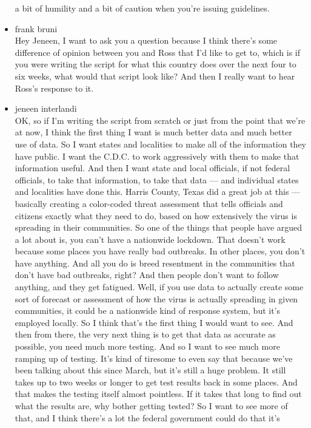 \begin{itemize}
  a bit of humility and a bit of caution when you're issuing guidelines.
\item
  frank bruni\\
  Hey Jeneen, I want to ask you a question because I think there's some
  difference of opinion between you and Ross that I'd like to get to,
  which is if you were writing the script for what this country does
  over the next four to six weeks, what would that script look like? And
  then I really want to hear Ross's response to it.
\item
  jeneen interlandi\\
  OK, so if I'm writing the script from scratch or just from the point
  that we're at now, I think the first thing I want is much better data
  and much better use of data. So I want states and localities to make
  all of the information they have public. I want the C.D.C. to work
  aggressively with them to make that information useful. And then I
  want state and local officials, if not federal officials, to take that
  information, to take that data --- and individual states and
  localities have done this. Harris County, Texas did a great job at
  this --- basically creating a color-coded threat assessment that tells
  officials and citizens exactly what they need to do, based on how
  extensively the virus is spreading in their communities. So one of the
  things that people have argued a lot about is, you can't have a
  nationwide lockdown. That doesn't work because some places you have
  really bad outbreaks. In other places, you don't have anything. And
  all you do is breed resentment in the communities that don't have bad
  outbreaks, right? And then people don't want to follow anything, and
  they get fatigued. Well, if you use data to actually create some sort
  of forecast or assessment of how the virus is actually spreading in
  given communities, it could be a nationwide kind of response system,
  but it's employed locally. So I think that's the first thing I would
  want to see. And then from there, the very next thing is to get that
  data as accurate as possible, you need much more testing. And so I
  want to see much more ramping up of testing. It's kind of tiresome to
  even say that because we've been talking about this since March, but
  it's still a huge problem. It still takes up to two weeks or longer to
  get test results back in some places. And that makes the testing
  itself almost pointless. If it takes that long to find out what the
  results are, why bother getting tested? So I want to see more of that,
  and I think there's a lot the federal government could do that it's

\end{itemize}
